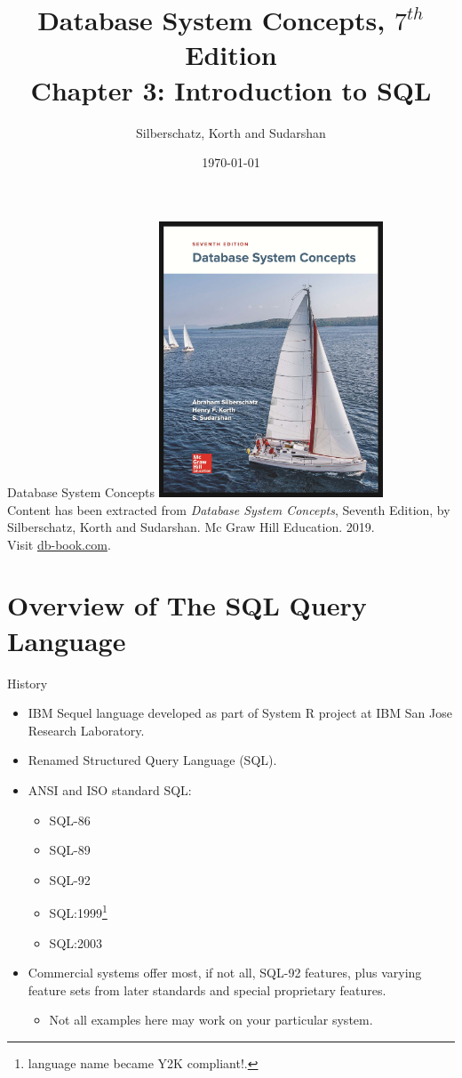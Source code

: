 \documentclass{beamer}
\title[Chapter 3]{Database System Concepts, $7^{th}$ Edition \\ Chapter 3: Introduction to SQL}
\author{Silberschatz, Korth and Sudarshan}
\date{\today}
\begin{document}
\frame{\titlepage}

\begin{frame}{Database System Concepts}
    \centering
    \includegraphics[width=0.5\textwidth]{figures/book_cover.jpg} \\
    \vspace{5mm}
    {
        \tiny
        Content has been extracted from \textit{Database System Concepts}, Seventh Edition, by Silberschatz, Korth and Sudarshan. Mc Graw Hill Education. 2019.\\
        Visit \href{https://db-book.com/}{db-book.com}.\\
    }
\end{frame}

\section{Overview of The SQL Query Language}

\begin{frame}{History}
    \begin{itemize}
        \item IBM Sequel language developed as part of System R project at IBM San Jose Research Laboratory.
        \item Renamed Structured Query Language (SQL).
        \item ANSI and ISO standard SQL:
        \begin{itemize}
            \item SQL-86
            \item SQL-89
            \item SQL-92
            \item SQL:1999\footnote{language name became Y2K compliant!.}
            \item SQL:2003
        \end{itemize}
        \item Commercial systems offer most, if not all, SQL-92 features, plus varying feature sets from later standards and special proprietary features.
        \begin{itemize}
            \item Not all examples here may work on your particular system.
        \end{itemize}
    \end{itemize}
\end{frame}
\end{document}
